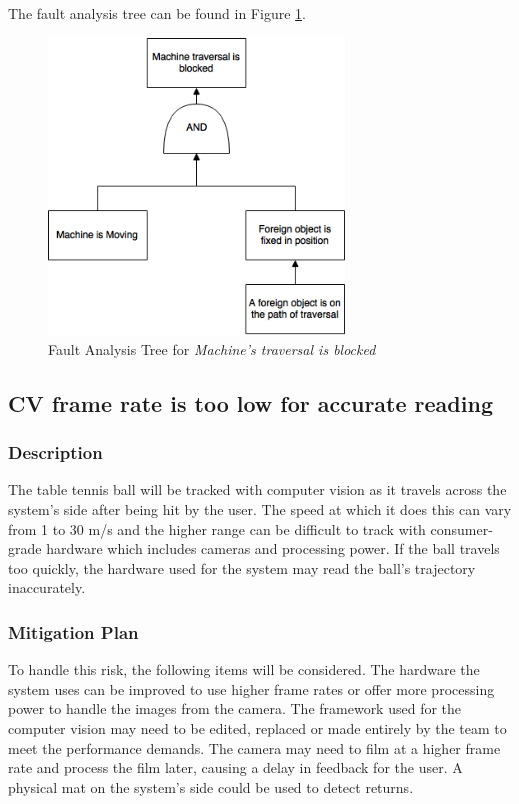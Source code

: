 \documentclass[11pt]{article}
\begin{document}
The fault analysis tree can be found in Figure \ref{fig:ft-traverse}.

\begin{figure}[H]
   \centering
   \includegraphics[width=0.7\textwidth]{img/ft-traverse.png} %
   \caption{Fault Analysis Tree for \textit{Machine's traversal is blocked}}
   \label{fig:ft-traverse}
\end{figure}

\subsection{CV frame rate is too low for accurate reading}
\subsubsection*{Description}
The table tennis ball will be tracked with computer vision as it travels across the system's side after being hit by the user. The speed at which it does this can vary from 1 to 30 m/s and the higher range can be difficult to track with consumer-grade hardware which includes cameras and processing power. If the ball travels too quickly, the hardware used for the system may read the ball's trajectory inaccurately.
\subsubsection*{Mitigation Plan}
To handle this risk, the following items will be considered. The hardware the system uses can be improved to use higher frame rates or offer more processing power to handle the images from the camera. The framework used for the computer vision may need to be edited, replaced or made entirely by the team to meet the performance demands. The camera may need to film at a higher frame rate and process the film later, causing a delay in feedback for the user. A physical mat on the system's side could be used to detect returns. \\ \\
\end{document}

